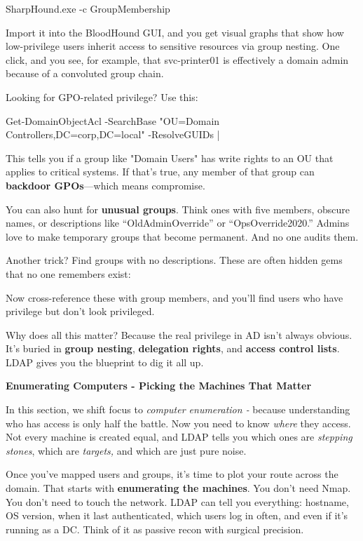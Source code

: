SharpHound.exe -c GroupMembership

Import it into the BloodHound GUI, and you get visual graphs that show how low-privilege users inherit access to sensitive resources via group nesting. One click, and you see, for example, that svc-printer01 is effectively a domain admin because of a convoluted group chain.

Looking for GPO-related privilege? Use this:

Get-DomainObjectAcl -SearchBase "OU=Domain Controllers,DC=corp,DC=local" -ResolveGUIDs | 


This tells you if a group like "Domain Users" has write rights to an OU that applies to critical systems. If that’s true, any member of that group can \textbf{backdoor GPOs}—which means compromise.

You can also hunt for \textbf{unusual groups}. Think ones with five members, obscure names, or descriptions like “OldAdminOverride” or “OpsOverride2020.” Admins love to make temporary groups that become permanent. And no one audits them.

Another trick? Find groups with no descriptions. These are often hidden gems that no one remembers exist:


Now cross-reference these with group members, and you’ll find users who have privilege but don’t look privileged.

Why does all this matter? Because the real privilege in AD isn’t always obvious. It’s buried in \textbf{group nesting}, \textbf{delegation rights}, and \textbf{access control lists}. LDAP gives you the blueprint to dig it all up.

\textbf{Enumerating Computers - Picking the Machines That Matter}

In this section, we shift focus to \textit{computer enumeration - }because understanding who has access is only half the battle. Now you need to know \textit{where} they access. Not every machine is created equal, and LDAP tells you which ones are \textit{stepping stones}, which are \textit{targets, }and which are just pure noise.

Once you’ve mapped users and groups, it’s time to plot your route across the domain. That starts with \textbf{enumerating the machines}. You don’t need Nmap. You don’t need to touch the network. LDAP can tell you everything: hostname, OS version, when it last authenticated, which users log in often, and even if it’s running as a DC. Think of it as passive recon with surgical precision.

